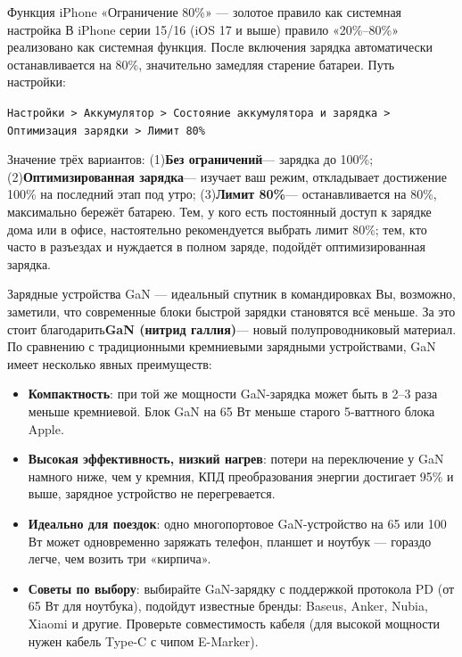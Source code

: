 \begin{tcbinfo}{Функция iPhone «Ограничение 80\%» — золотое правило как системная настройка}
В iPhone серии 15/16 (iOS 17 и выше) правило «20\%–80\%» реализовано как системная функция. После включения зарядка автоматически останавливается на 80\%, значительно замедляя старение батареи. Путь настройки:

\texttt{Настройки > Аккумулятор > Состояние аккумулятора и зарядка > Оптимизация зарядки > Лимит 80\%}

Значение трёх вариантов: (1)\textbf{Без ограничений}— зарядка до 100\%; (2)\textbf{Оптимизированная зарядка}— изучает ваш режим, откладывает достижение 100\% на последний этап под утро; (3)\textbf{Лимит 80\%}— останавливается на 80\%, максимально бережёт батарею. Тем, у кого есть постоянный доступ к зарядке дома или в офисе, настоятельно рекомендуется выбрать лимит 80\%; тем, кто часто в разъездах и нуждается в полном заряде, подойдёт оптимизированная зарядка.

\end{tcbinfo}

\begin{tcbinfo}{Зарядные устройства GaN — идеальный спутник в командировках}
Вы, возможно, заметили, что современные блоки быстрой зарядки становятся всё меньше. За это стоит благодарить\textbf{GaN (нитрид галлия)}— новый полупроводниковый материал. По сравнению с традиционными кремниевыми зарядными устройствами, GaN имеет несколько явных преимуществ:

\begin{itemize}
  \item \textbf{Компактность}: при той же мощности GaN-зарядка может быть в 2–3 раза меньше кремниевой. Блок GaN на 65 Вт меньше старого 5-ваттного блока Apple.
  \item \textbf{Высокая эффективность, низкий нагрев}: потери на переключение у GaN намного ниже, чем у кремния, КПД преобразования энергии достигает 95\% и выше, зарядное устройство не перегревается.
  \item \textbf{Идеально для поездок}: одно многопортовое GaN-устройство на 65 или 100 Вт может одновременно заряжать телефон, планшет и ноутбук — гораздо легче, чем возить три «кирпича».
  \item \textbf{Советы по выбору}: выбирайте GaN-зарядку с поддержкой протокола PD (от 65 Вт для ноутбука), подойдут известные бренды: Baseus, Anker, Nubia, Xiaomi и другие. Проверьте совместимость кабеля (для высокой мощности нужен кабель Type-C с чипом E-Marker).
\end{itemize}

\end{tcbinfo}

